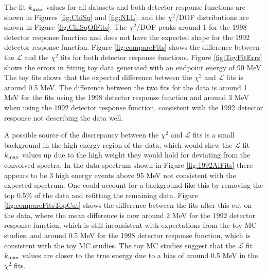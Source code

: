 The fit $\mbox{$k_{\rm max}$}$ values for all 
datasets and both detector response functions are shown in Figures \ref{fig:ChiSq} and \ref{fig:NLL}, and the $\chi^2$/DOF
distributions are shown in Figure \ref{fig:ChiSqOfFits}. 
The $\chi^2$/DOF peaks around 1 for the 1998 detector response 
function and does not have the expected shape for the 1992 detector response function. Figure \ref{fig:compareFits}
shows the difference between the $\mathcal{L}$ and the $\chi^2$ fits for both detector response functions.
Figure \ref{fig:ToyFitErrs} shows the errors in fitting toy data generated with
an endpoint energy of 90 MeV. The toy fits shows that the expected difference between the $\chi^2$ and $\mathcal{L}$ fits 
is around 0.5 MeV. The difference between the two fits for the data is around 1 MeV for the fits using the 1998 detector 
response function and around 3 MeV when using the 1992 detector response function, consistent with the 1992 detector response 
not describing the data well. 

A possible source of the discrepancy between the $\chi^2$ and $\mathcal{L}$ fits is a small background 
in the high energy region of the data, which would skew the $\mathcal{L}$ fit $\mbox{$k_{\rm max}$}$ values up due to the high weight they would hold for deviating
from the convolved spectra. In the data spectrum shown in Figure \ref{fig:1992AlFits} there appears to be 3 high energy events above 95 MeV
not consistent with the expected spectrum. One could account for a background like this by removing the top 0.5\% of the data and refitting the remaining
data. Figure \ref{fig:compareFitsTopCut} shows the difference between the fits after this cut on the data, where the 
mean difference is now around 2 MeV for the 1992 detector response function, which is still inconsistent with expectations from
the toy MC studies, and around 0.5 MeV for the 1998 detector response function, which is consistent with the toy MC studies.
The toy MC studies suggest that the $\mathcal{L}$ fit $\mbox{$k_{\rm max}$}$ values are closer to the true energy due to a bias of around 0.5 MeV 
in the $\chi^2$ fits.


